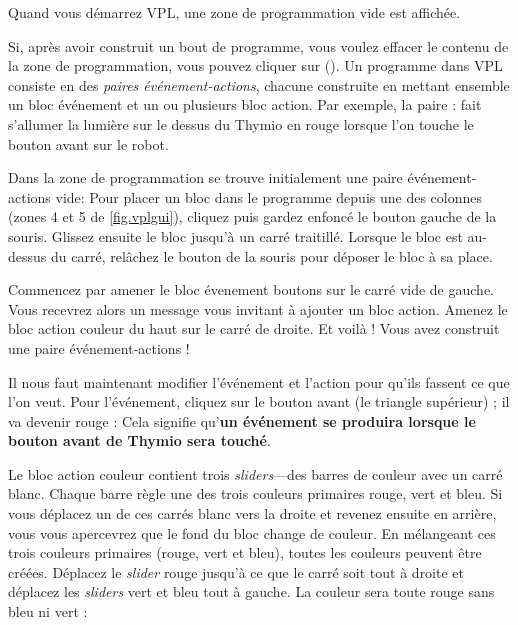 \newpage


Quand vous démarrez VPL, une zone de programmation vide est affichée.

Si, après avoir construit un bout de programme, vous voulez effacer le contenu de la zone de programmation, vous pouvez cliquer sur  ().
Un programme dans VPL consiste en des \emph{paires événement-actions}, chacune construite en mettant ensemble un bloc événement et un ou plusieurs bloc action.
Par exemple, la paire :  fait s'allumer la lumière sur le dessus du Thymio en rouge lorsque l'on touche le bouton avant sur le robot.


Dans la zone de programmation se trouve initialement une paire événement-actions vide: 
Pour placer un bloc dans le programme depuis une des colonnes (zones 4 et 5 de \cref{fig.vplgui}), cliquez puis gardez enfoncé le bouton gauche de la souris.
Glissez ensuite le bloc jusqu'à un carré traitillé.
Lorsque le bloc est au-dessus du carré, relâchez le bouton de la souris pour déposer le bloc à sa place.


Commencez par amener le bloc évenement boutons  sur le carré vide de gauche.
Vous recevrez alors un message vous invitant à ajouter un bloc action.
Amenez le bloc action couleur du haut  sur le carré de droite.
Et voilà ! Vous avez construit une paire événement-actions !

Il nous faut maintenant modifier l'événement et l'action pour qu'ils fassent ce que l'on veut.
Pour l'événement, cliquez sur le bouton avant (le triangle supérieur) ; il va devenir rouge : 
Cela signifie qu'\textbf{un événement se produira lorsque le bouton avant de Thymio sera touché}.

Le bloc action couleur contient trois \textit{sliders}---des barres de couleur avec un carré blanc.
Chaque barre règle une des trois couleurs primaires rouge, vert et bleu.
Si vous déplacez un de ces carrés blanc vers la droite et revenez ensuite en arrière,
vous vous apercevrez que le fond du bloc change de couleur.
En mélangeant ces trois couleurs primaires (rouge, vert et bleu),
toutes les couleurs peuvent être créées.
Déplacez le \textit{slider} rouge jusqu'à ce que le carré soit
tout à droite et déplacez les \textit{sliders} vert et bleu tout à gauche.
La couleur sera toute rouge sans bleu ni vert : 


